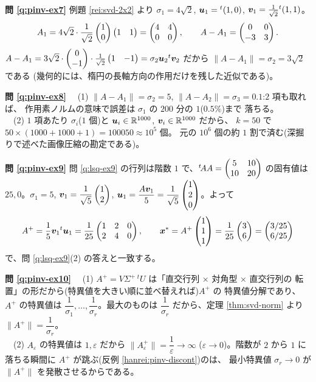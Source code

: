 \bigskip
\noindent\textbf{問 \ref{q:pinv-ex7}}\quad
例題 \ref{rei:svd-2x2} より $\sigma_1 = 4\sqrt{2}$,
$\bm{u}_1 = {}^t(1, 0)$, $\bm{v}_1 = \frac{1}{\sqrt{2}}{}^t(1, 1)$。
\[
A_1 = 4\sqrt{2}\cdot\frac{1}{\sqrt{2}}\begin{pmatrix}1 \\ 0\end{pmatrix}\begin{pmatrix}1 & 1\end{pmatrix}
= \begin{pmatrix}4 & 4 \\ 0 & 0\end{pmatrix}, \qquad
A - A_1 = \begin{pmatrix}0 & 0 \\ -3 & 3\end{pmatrix}.
\]
$A - A_1 = 3\sqrt{2}\cdot\begin{pmatrix}0 \\ -1\end{pmatrix}\cdot\frac{1}{\sqrt{2}}\begin{pmatrix}1 & -1\end{pmatrix}
= \sigma_2\bm{u}_2{}^t\bm{v}_2$ だから
$\|A - A_1\| = \sigma_2 = 3\sqrt{2}$ である
(幾何的には、楕円の長軸方向の作用だけを残した近似である)。

\bigskip
\noindent\textbf{問 \ref{q:pinv-ex8}}\quad
　(1) $\|A - A_1\| = \sigma_2 = 5$,
$\|A - A_2\| = \sigma_3 = 0.1$:$2$ 項も取れば、
作用素ノルムの意味で誤差は $\sigma_1$ の $200$ 分の $1$($0.5\%$)まで
落ちる。\\
　(2) $1$ 項あたり $\sigma_i$($1$ 個)と
$\bm{u}_i \in \mathbb{R}^{1000}$, $\bm{v}_i \in \mathbb{R}^{1000}$ だから、
$k = 50$ で $50 \times (1000 + 1000 + 1) = 100050 \approx 10^5$ 個。
元の $10^6$ 個の約 $1$ 割で済む(深掘りで述べた画像圧縮の勘定である)。

\bigskip
\noindent\textbf{問 \ref{q:pinv-ex9}}\quad
問 \ref{q:lsq-ex9} の行列は階数 $1$ で、${}^t\!AA = \begin{pmatrix}5 & 10 \\ 10 & 20\end{pmatrix}$
の固有値は $25, 0$。$\sigma_1 = 5$,
$\bm{v}_1 = \dfrac{1}{\sqrt{5}}\begin{pmatrix}1 \\ 2\end{pmatrix}$,
$\bm{u}_1 = \dfrac{A\bm{v}_1}{5}
= \dfrac{1}{\sqrt{5}}\begin{pmatrix}1 \\ 2 \\ 0\end{pmatrix}$。よって
\[
A^{+} = \frac{1}{5}\bm{v}_1{}^t\bm{u}_1
= \frac{1}{25}\begin{pmatrix}1 & 2 & 0 \\ 2 & 4 & 0\end{pmatrix}, \qquad
\bm{x}^* = A^{+}\begin{pmatrix}1 \\ 1 \\ 1\end{pmatrix}
= \frac{1}{25}\begin{pmatrix}3 \\ 6\end{pmatrix} = \begin{pmatrix}3/25 \\ 6/25\end{pmatrix}
\]
で、問 \ref{q:lsq-ex9}(2) の答えと一致する。

\bigskip
\noindent\textbf{問 \ref{q:pinv-ex10}}\quad
　(1) $A^{+} = V\Sigma^{+}\,{}^tU$ は「直交行列 × 対角型 × 直交行列の
転置」の形だから(特異値を大きい順に並べ替えれば)$A^{+}$ の
特異値分解であり、$A^{+}$ の特異値は
$\dfrac{1}{\sigma_1}, \dots, \dfrac{1}{\sigma_r}$。最大のものは
$\dfrac{1}{\sigma_r}$ だから、定理 \ref{thm:svd-norm} より
$\|A^{+}\| = \dfrac{1}{\sigma_r}$。\\
　(2) $A_{\varepsilon}$ の特異値は $1, \varepsilon$ だから
$\|A_{\varepsilon}^{+}\| = \dfrac{1}{\varepsilon} \to \infty$
($\varepsilon \to 0$)。階数が $2$ から $1$ に落ちる瞬間に
$A^{+}$ が跳ぶ(反例 \ref{hanrei:pinv-discont})のは、
最小特異値 $\sigma_r \to 0$ が $\|A^{+}\|$ を発散させるからである。

